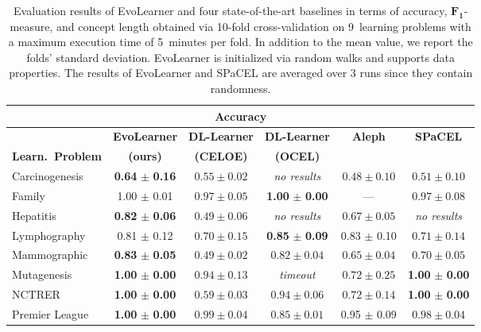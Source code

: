 \begin{table}[tbp]
  \centering
  \caption{Evaluation results of EvoLearner and four state-of-the-art baselines in terms of accuracy, $\boldsymbol{F_1}$-measure, and concept length obtained via 10-fold cross-validation on 9~learning problems with a maximum execution time of 5~minutes per fold. In addition to the mean value, we report the folds' standard deviation. EvoLearner is initialized via random walks and supports data properties. The results of Evo\-Learner and SPaCEL are averaged over 3 runs since they contain randomness.}%
  \label{tab:evaluation-results}
  \footnotesize
  \setlength{\tabcolsep}{1.5pt}
  \renewcommand{\arraystretch}{1.08}
  \begin{tabular}{@{}lccccc@{}}
    \toprule
    \multicolumn{6}{c}{\textbf{Accuracy}}\\
    \midrule
     & \textbf{EvoLearner} & \textbf{DL-Learner} & \textbf{DL-Learner} & \textbf{Aleph} & \textbf{SPaCEL}  \\
    \textbf{Learn.~Problem} & \textbf{(ours)}  & \textbf{(CELOE)} & \textbf{(OCEL)} &  &  \\
    \midrule
    Carcinogenesis &  \textbf{0.64} $\boldsymbol{\pm}$ \textbf{0.16}   & $0.55 \pm 0.02$ & \textit{no results} & $0.48 \pm 0.10$ & $0.51 \pm 0.10$ \\
    Family & 1.00 $\pm$ 0.01 & $0.97 \pm 0.05$ & \textbf{1.00} $\boldsymbol{\pm}$ \textbf{0.00} & --- & $0.97 \pm 0.08$  \\
    Hepatitis & \textbf{0.82} $\boldsymbol{\pm}$ \textbf{0.06}  & $0.49 \pm 0.06$ & \textit{no results} & $0.67 \pm 0.05$ & \textit{no results}  \\
    Lymphography & 0.81 $\pm$ 0.12  & $0.70 \pm 0.15$ & \textbf{0.85} $\boldsymbol{\pm} $ \textbf{0.09} & 0.83 $\pm$ 0.10 & $0.71 \pm 0.14$  \\
    Mammographic & \textbf{0.83} $\boldsymbol{\pm}$ \textbf{0.05} & $0.49 \pm 0.02$ & $0.82 \pm 0.04$ & $0.65 \pm 0.04$ &  $0.70 \pm 0.05$ \\
    Mutagenesis & \textbf{1.00} $\boldsymbol{\pm} $ \textbf{0.00}  & $0.94 \pm 0.13$ & \textit{timeout} & $0.72 \pm 0.25$ & \textbf{1.00} $\boldsymbol{\pm} $ \textbf{0.00} \\ %
    NCTRER & \textbf{1.00} $\boldsymbol{\pm}$ \textbf{0.00}&  $0.59 \pm 0.03$ & $0.94 \pm 0.06$ & $0.72 \pm 0.14$ &  \textbf{1.00} $\boldsymbol{\pm}$ \textbf{0.00}  \\
    Premier League & \textbf{1.00} $\boldsymbol{\pm}$ \textbf{0.00} & $0.99 \pm 0.04$ & $0.85 \pm 0.01$ & 0.95 $\pm $ 0.09 & $0.98 \pm 0.04$ \\

\end{tabular}
\end{table}
